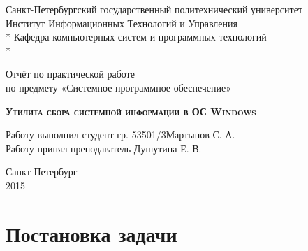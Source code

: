 \documentclass[a4paper, 12pt]{report}		%
\begin{document}
\begin{titlepage}
\thispagestyle{empty}

\begin{center}
Санкт-Петербургский государственный политехнический университет \\
Институт Информационных Технологий и Управления \\*
Кафедра компьютерных систем и программных технологий \\*
\hrulefill
\end{center}

\vspace{18em}

\begin{center}
\Large Отчёт по практической работе\\по предмету «Системное программное обеспечение» \\
\end{center}

\vspace{1em}

\begin{center}
\textsc{\textbf{Утилита сбора системной информации в ОС Windows}}
\end{center}

\vspace{16em}

\begin{flushleft}
Работу выполнил студент гр. 53501/3\hrulefill Мартынов С. А. \\
\vspace{1.5em}
Работу принял преподаватель \hrulefill Душутина Е. В. \\
\end{flushleft}

\vspace{\fill}

\begin{center}
Санкт-Петербург \\
2015
\end{center}

\end{titlepage}
\setcounter{page}{2}
\tableofcontents

\chapter*{Постановка задачи}
\end{document}
